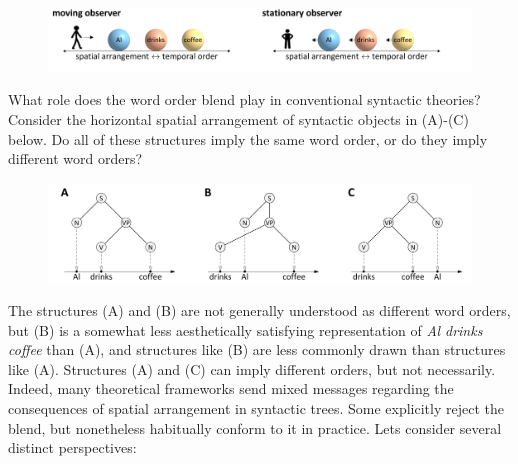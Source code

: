   
\begin{figure}
\includegraphics[width=\textwidth]{figures/Tilsen-img39.png}
\caption{\missingcaption}
\label{fig:3:11}
\end{figure}
 

  What role does the word order blend play in conventional syntactic theories? Consider the horizontal spatial arrangement of syntactic objects in (A)-(C) below. Do all of these structures imply the same word order, or do they imply different word orders?

  
\begin{figure}
\includegraphics[width=\textwidth]{figures/Tilsen-img40.png}
\caption{\missingcaption}
\label{fig:3:12}
\end{figure}
 

The structures (A) and (B) are not generally understood as different word orders, but (B) is a somewhat less aesthetically satisfying representation of \textit{Al drinks coffee} than (A), and structures like (B) are less commonly drawn than structures like (A). Structures (A) and (C) can imply different orders, but not necessarily. Indeed, many theoretical frameworks send mixed messages regarding the consequences of spatial arrangement in syntactic trees. Some explicitly reject the blend, but nonetheless habitually conform to it in practice. Lets consider several distinct perspectives:

